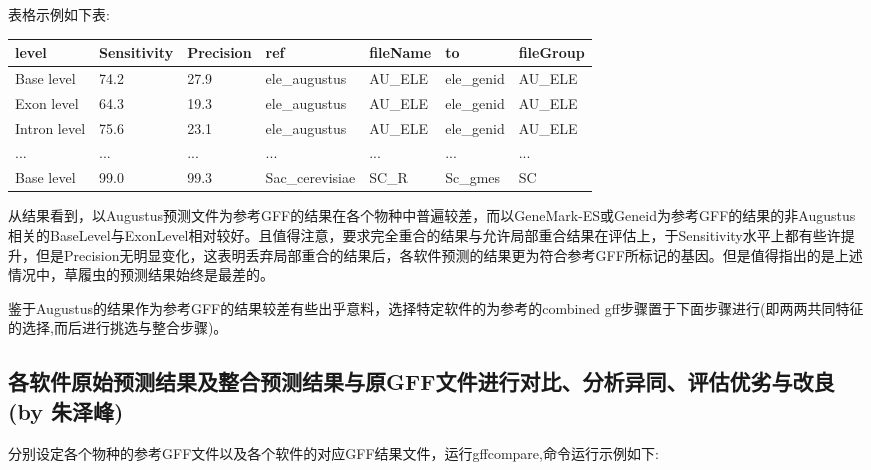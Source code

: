 \documentclass[12pt]{ctexart}
\begin{document}
表格示例如下表:

\begin{minipage}{\linewidth}
\centering
{} \label{tab:title} 
\begin{tabular}{ C{0.55in} *6{C{0.75in}}}\toprule[1.5pt]
\textbf{level} & \textbf{Sensitivity} & \textbf{Precision} & \textbf{ref}               & \textbf{fileName} & \textbf{to}              & \textbf{fileGroup} \\ \hline
Base level     & 74.2                 & 27.9               & ele\_augustus & AU\_ELE     & ele\_genid & AU\_ELE            \\
Exon level     & 64.3                 & 19.3               & ele\_augustus & AU\_ELE     & ele\_genid & AU\_ELE            \\
Intron level   & 75.6                 & 23.1               & ele\_augustus & AU\_ELE     & ele\_genid & AU\_ELE            \\
...            & ...                  & ...                & ...                        & ...               & ...                      & ...                \\
Base level     & 99.0                 & 99.3               & Sac\_cerevisiae        & SC\_R       & Sc\_gmes            & SC                 \\
\bottomrule[1.25pt]
\end {tabular}\par
\bigskip
\end{minipage}



从结果看到，以Augustus预测文件为参考GFF的结果在各个物种中普遍较差，而以GeneMark-ES或Geneid为参考GFF的结果的非Augustus相关的BaseLevel与ExonLevel相对较好。且值得注意，要求完全重合的结果与允许局部重合结果在评估上，于Sensitivity水平上都有些许提升，但是Precision无明显变化，这表明丢弃局部重合的结果后，各软件预测的结果更为符合参考GFF所标记的基因。但是值得指出的是上述情况中，草履虫的预测结果始终是最差的。

鉴于Augustus的结果作为参考GFF的结果较差有些出乎意料，选择特定软件的为参考的combined gff步骤置于下面步骤进行(即两两共同特征的选择,而后进行挑选与整合步骤)。

\subsection{各软件原始预测结果及整合预测结果与原GFF文件进行对比、分析异同、评估优劣与改良 (by 朱泽峰)}

分别设定各个物种的参考GFF文件以及各个软件的对应GFF结果文件，运行gffcompare,命令运行示例如下:
\end{document}
